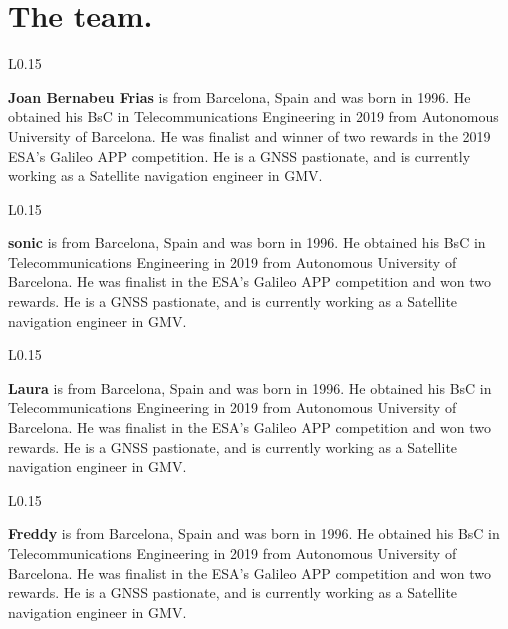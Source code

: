 
\section{The team.}
\begin{wrapfigure}{L}{0.15\textwidth}
    \end{wrapfigure}
\textbf{Joan Bernabeu Frias} is from Barcelona, Spain and was born in 1996. He obtained his BsC in Telecommunications Engineering in 2019 from Autonomous University of Barcelona. He was finalist and winner of two rewards in the 2019 ESA's Galileo APP competition. He is a GNSS pastionate, and is currently working as a Satellite navigation engineer in GMV.\\

\begin{wrapfigure}{L}{0.15\textwidth}
    \end{wrapfigure}
\textbf{sonic} is from Barcelona, Spain and was born in 1996. He obtained his BsC in Telecommunications Engineering in 2019 from Autonomous University of Barcelona. He was finalist in the ESA's Galileo APP competition and won two rewards. He is a GNSS pastionate, and is currently working as a Satellite navigation engineer in GMV.\\

\begin{wrapfigure}{L}{0.15\textwidth}
    \end{wrapfigure}
\textbf{Laura} is from Barcelona, Spain and was born in 1996. He obtained his BsC in Telecommunications Engineering in 2019 from Autonomous University of Barcelona. He was finalist in the ESA's Galileo APP competition and won two rewards. He is a GNSS pastionate, and is currently working as a Satellite navigation engineer in GMV.\\

\begin{wrapfigure}{L}{0.15\textwidth}
    \end{wrapfigure}
\textbf{Freddy} is from Barcelona, Spain and was born in 1996. He obtained his BsC in Telecommunications Engineering in 2019 from Autonomous University of Barcelona. He was finalist in the ESA's Galileo APP competition and won two rewards. He is a GNSS pastionate, and is currently working as a Satellite navigation engineer in GMV.\\

